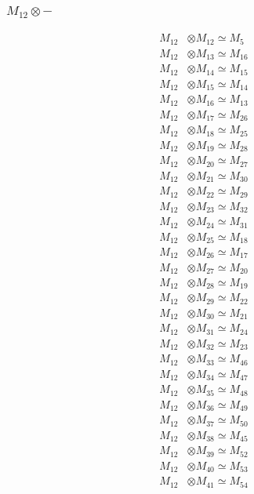 \subsubsection{$ M_{12}\otimes -$}
\begin{align*}
M_{12} &\otimes M_{12} \simeq M_{5} \\
M_{12} &\otimes M_{13} \simeq M_{16} \\
M_{12} &\otimes M_{14} \simeq M_{15} \\
M_{12} &\otimes M_{15} \simeq M_{14} \\
M_{12} &\otimes M_{16} \simeq M_{13} \\
M_{12} &\otimes M_{17} \simeq M_{26} \\
M_{12} &\otimes M_{18} \simeq M_{25} \\
M_{12} &\otimes M_{19} \simeq M_{28} \\
M_{12} &\otimes M_{20} \simeq M_{27} \\
M_{12} &\otimes M_{21} \simeq M_{30} \\
M_{12} &\otimes M_{22} \simeq M_{29} \\
M_{12} &\otimes M_{23} \simeq M_{32} \\
M_{12} &\otimes M_{24} \simeq M_{31} \\
M_{12} &\otimes M_{25} \simeq M_{18} \\
M_{12} &\otimes M_{26} \simeq M_{17} \\
M_{12} &\otimes M_{27} \simeq M_{20} \\
M_{12} &\otimes M_{28} \simeq M_{19} \\
M_{12} &\otimes M_{29} \simeq M_{22} \\
M_{12} &\otimes M_{30} \simeq M_{21} \\
M_{12} &\otimes M_{31} \simeq M_{24} \\
M_{12} &\otimes M_{32} \simeq M_{23} \\
M_{12} &\otimes M_{33} \simeq M_{46} \\
M_{12} &\otimes M_{34} \simeq M_{47} \\
M_{12} &\otimes M_{35} \simeq M_{48} \\
M_{12} &\otimes M_{36} \simeq M_{49} \\
M_{12} &\otimes M_{37} \simeq M_{50} \\
M_{12} &\otimes M_{38} \simeq M_{45} \\
M_{12} &\otimes M_{39} \simeq M_{52} \\
M_{12} &\otimes M_{40} \simeq M_{53} \\
M_{12} &\otimes M_{41} \simeq M_{54} \\

\end{align*}
